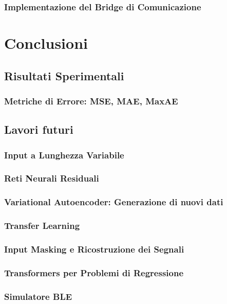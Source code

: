 \documentclass[12pt]{report}
\begin{document}
\subsection{Implementazione del Bridge di Comunicazione}

\chapter{Conclusioni}
\section{Risultati Sperimentali}
\subsection{Metriche di Errore: MSE, MAE, MaxAE}

\section{Lavori futuri}
\subsection{Input a Lunghezza Variabile}
\subsection{Reti Neurali Residuali}
\subsection{Variational Autoencoder: Generazione di nuovi dati}
\subsection{Transfer Learning}
\subsection{Input Masking e Ricostruzione dei Segnali}
\subsection{Transformers per Problemi di Regressione}
\subsection{Simulatore BLE}

\appendix



\end{document}
